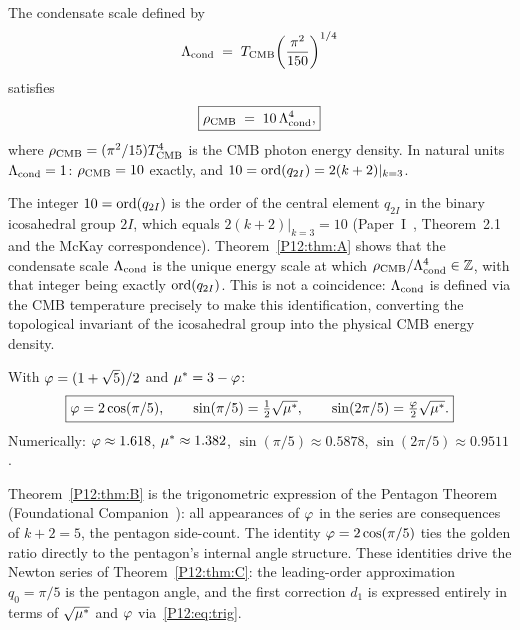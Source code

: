 

\begin{theorem}
\label{P12:thm:A}
The condensate scale defined by
\begin{equation}
  \Lambda_{\mathrm{cond}} \;=\; T_{\mathrm{CMB}}\!\left(\frac{\pi^2}{150}\right)^{1/4}
  \label{P12:eq:Lcond_def}
\end{equation}
satisfies
\begin{equation}
  \boxed{\rho_{\mathrm{CMB}} \;=\; 10\,\Lambda_{\mathrm{cond}}^4,}
  \label{P12:eq:rho10}
\end{equation}
where $\rho_{\mathrm{CMB}}=(\pi^2/15)T_{\mathrm{CMB}}^4$ is the CMB photon energy density.
In natural units $\Lambda_{\mathrm{cond}}=1$: $\rho_{\mathrm{CMB}}=10$ exactly, and
$10 = \operatorname{ord}(q_{2I}) = 2(k+2)|_{k=3}$.
\end{theorem}

\begin{remark}[Why $\ord(q_{2I})=10$ is the CMB density]
\label{P12:rem:ord10}
The integer $10=\operatorname{ord}(q_{2I})$ is the order of the central element $q_{2I}$
in the binary icosahedral group $2I$, which equals $2(k+2)|_{k=3}=10$
(Paper~I~\cite{Paper1}, Theorem~2.1 and the McKay correspondence).
Theorem~\ref{P12:thm:A} shows that the condensate scale $\Lambda_{\mathrm{cond}}$ is the
unique energy scale at which $\rho_{\mathrm{CMB}}/\Lambda_{\mathrm{cond}}^4\in\mathbb{Z}$,
with that integer being exactly $\operatorname{ord}(q_{2I})$.
This is not a coincidence: $\Lambda_{\mathrm{cond}}$ is defined via the CMB temperature
precisely to make this identification, converting the topological
invariant of the icosahedral group into the physical CMB energy density.
\end{remark}

\begin{theorem}
\label{P12:thm:B}
With $\varphi=(1+\sqrt{5})/2$ and $\mu^*=3-\varphi$:
\begin{equation}
  \boxed{
  \varphi = 2\cos(\pi/5),\qquad
  \sin(\pi/5)=\tfrac{1}{2}\sqrt{\mu^*},\qquad
  \sin(2\pi/5)=\tfrac{\varphi}{2}\sqrt{\mu^*}.
  }
  \label{P12:eq:trig}
\end{equation}
Numerically: $\varphi\approx1.618$, $\mu^*\approx1.382$,
$\sin(\pi/5)\approx0.5878$, $\sin(2\pi/5)\approx0.9511$.
\end{theorem}

\begin{remark}
\label{P12:rem:pentagon}
Theorem~\ref{P12:thm:B} is the trigonometric expression of the
Pentagon Theorem (Foundational Companion~\cite{PaperFC}):
all appearances of $\varphi$ in the series are consequences of $k+2=5$,
the pentagon side-count.
The identity $\varphi=2\cos(\pi/5)$ ties the golden ratio directly to
the pentagon's internal angle structure.
These identities drive the Newton series of Theorem~\ref{P12:thm:C}:
the leading-order approximation $q_0=\pi/5$ is the pentagon angle,
and the first correction $d_1$ is expressed entirely in terms of
$\sqrt{\mu^*}$ and $\varphi$ via~\eqref{P12:eq:trig}.
\end{remark}

